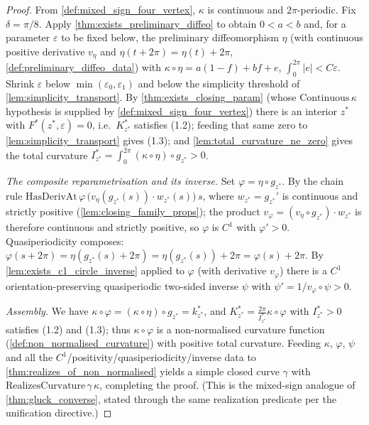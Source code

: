 \begin{proof}
  \leanok
  From \cref{def:mixed_sign_four_vertex}, $\kappa$ is continuous and $2\pi$-periodic.
  Fix $\delta=\pi/8$. Apply \cref{thm:exists_preliminary_diffeo} to obtain $0<a<b$
  and, for a parameter $\varepsilon$ to be fixed below, the preliminary
  diffeomorphism $\eta$ (with continuous positive derivative $v_\eta$ and
  $\eta(t+2\pi)=\eta(t)+2\pi$, \cref{def:preliminary_diffeo_data}) with
  $\kappa\circ\eta=a(1-f)+bf+e$, $\int_0^{2\pi}|e|<C\varepsilon$. Shrink $\varepsilon$
  below $\min(\varepsilon_0,\varepsilon_1)$ and below the simplicity threshold of
  \cref{lem:simplicity_transport}. By \cref{thm:exists_closing_param} (whose
  $\mathrm{Continuous}\,\kappa$ hypothesis is supplied by
  \cref{def:mixed_sign_four_vertex}) there is an interior $z^*$ with
  $F^*(z^*,\varepsilon)=0$, i.e.\ $K^*_{z^*}$ satisfies (1.2); feeding that same zero
  to \cref{lem:simplicity_transport} gives (1.3); and \cref{lem:total_curvature_ne_zero}
  gives the total curvature $I^*_{z^*}=\int_0^{2\pi}(\kappa\circ\eta)\circ g_{z^*}>0$.

  \emph{The composite reparametrisation and its inverse.} Set
  $\varphi=\eta\circ g_{z^*}$. By the chain rule
  $\mathrm{HasDerivAt}\,\varphi\,\bigl(v_\eta(g_{z^*}(s))\cdot w_{z^*}(s)\bigr)\,s$,
  where $w_{z^*}=g_{z^*}'$ is continuous and strictly positive
  (\cref{lem:closing_family_props}); the product $v_\varphi=
  (v_\eta\circ g_{z^*})\cdot w_{z^*}$ is therefore continuous and strictly positive,
  so $\varphi$ is $C^1$ with $\varphi'>0$. Quasiperiodicity composes:
  $\varphi(s+2\pi)=\eta(g_{z^*}(s)+2\pi)=\eta(g_{z^*}(s))+2\pi=\varphi(s)+2\pi$. By
  \cref{lem:exists_c1_circle_inverse} applied to $\varphi$ (with derivative
  $v_\varphi$) there is a $C^1$ orientation-preserving quasiperiodic two-sided
  inverse $\psi$ with $\psi'=1/v_\varphi\circ\psi>0$.

  \emph{Assembly.} We have $\kappa\circ\varphi=(\kappa\circ\eta)\circ g_{z^*}=k^*_{z^*}$,
  and $K^*_{z^*}=\tfrac{2\pi}{I^*_{z^*}}\kappa\circ\varphi$ with $I^*_{z^*}>0$ satisfies
  (1.2) and (1.3); thus $\kappa\circ\varphi$ is a non-normalised curvature function
  (\cref{def:non_normalised_curvature}) with positive total curvature. Feeding
  $\kappa$, $\varphi$, $\psi$ and all the $C^1$/positivity/quasiperiodicity/inverse
  data to \cref{thm:realizes_of_non_normalised} yields a simple closed curve $\gamma$
  with $\mathrm{RealizesCurvature}\,\gamma\,\kappa$, completing the proof. (This is the
  mixed-sign analogue of \cref{thm:gluck_converse}, stated through the same
  realization predicate per the unification directive.)
\end{proof}

